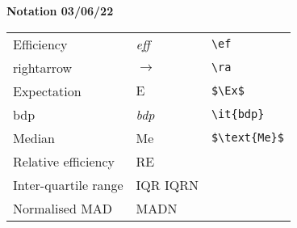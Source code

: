 \documentclass[12pt,a4paper]{article}
\newcommand{\ra}{$\rightarrow \;$}
\begin{document}
%


\large

{\bf  Notation 03/06/22}
\newline

\normalsize

\begin{tabular}{lll}
Efficiency & \it{eff} & \verb=\ef=\\
rightarrow & $\rightarrow$ & \verb=\ra= \\
Expectation & $\mbox{E}$  & \verb=$\Ex$= \\
bdp & \it{bdp} & \verb=\it{bdp}=\\
Median & Me & \verb=$\text{Me}$= \\
Relative efficiency & RE \\
Inter-quartile range & IQR IQRN\\
Normalised MAD & MADN\\
\end{tabular}
\end{document}
